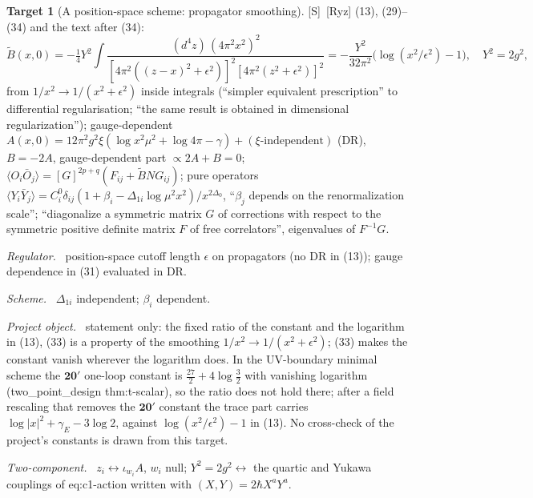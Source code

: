 \documentclass[11pt]{article}
\theoremstyle{definition}
\newtheorem{target}{Target}
\newcommand{\Sl}{\textup{[S]}}
\newcommand{\fld}[1]{\par\textit{#1.}\ }
\begin{document}
\begin{target}[A position-space scheme: propagator smoothing]\label{t:ryz}
\Sl\ [Ryz] (13), (29)--(34) and the text after (34):
\[
\tilde B(x,0)=-\tfrac14Y^2\!\int\!\frac{(d^4z)\,(4\pi^2x^2)^2}{[4\pi^2((z-x)^2+\epsilon^2)]^2[4\pi^2(z^2+\epsilon^2)]^2}=-\frac{Y^2}{32\pi^2}\big(\log(x^2/\epsilon^2)-1\big),\quad Y^2=2g^2,
\]
from $1/x^2\to1/(x^2+\epsilon^2)$ inside integrals (``simpler equivalent prescription'' to differential regularisation; ``the same result is obtained in dimensional regularization''); gauge-dependent $A(x,0)=12\pi^2g^2\xi(\log x^2\mu^2+\log4\pi-\gamma)+(\xi\text{-independent})$ (DR), $B=-2A$, gauge-dependent part $\propto2A+B=0$; $\langle O_i\bar O_j\rangle=[G]^{2p+q}(F_{ij}+\tilde BNG_{ij})$; pure operators $\langle Y_i\bar Y_j\rangle=C_i^0\delta_{ij}(1+\beta_i-\Delta_{1i}\log\mu^2x^2)/x^{2\Delta_0}$, ``$\beta_j$ depends on the renormalization scale''; ``diagonalize a symmetric matrix $G$ of corrections with respect to the symmetric positive definite matrix $F$ of free correlators'', eigenvalues of $F^{-1}G$.
\fld{Regulator} position-space cutoff length $\epsilon$ on propagators (no DR in (13)); gauge dependence in (31) evaluated in DR.
\fld{Scheme} $\Delta_{1i}$ independent; $\beta_i$ dependent.
\fld{Project object} statement only: the fixed ratio of the constant and the logarithm in (13), (33) is a property of the smoothing $1/x^2\to1/(x^2+\epsilon^2)$; (33) makes the constant vanish wherever the logarithm does. In the UV-boundary minimal scheme the $\mathbf{20'}$ one-loop constant is $\tfrac{27}2+4\log\tfrac32$ with vanishing logarithm (two\_point\_design thm:t-scalar), so the ratio does not hold there; after a field rescaling that removes the $\mathbf{20'}$ constant the trace part carries $\log|x|^2+\gamma_E-3\log2$, against $\log(x^2/\epsilon^2)-1$ in (13). No cross-check of the project's constants is drawn from this target.
\fld{Two-component} $z_i\leftrightarrow\iota_{w_i}A$, $w_i$ null; $Y^2=2g^2\leftrightarrow$ the quartic and Yukawa couplings of eq:c1-action written with $(X,Y)=2\hbar X^aY^a$.
\end{target}
\end{document}
